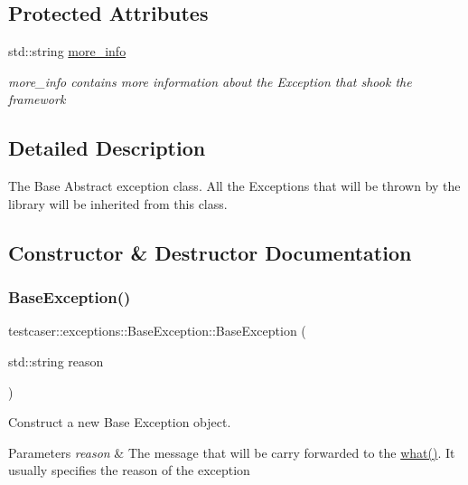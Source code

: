 \subsection*{Protected Attributes}
\begin{DoxyCompactItemize}
\item 
std\+::string \mbox{\hyperlink{classtestcaser_1_1exceptions_1_1BaseException_abfc26d4451ae832886c32ad2e283104e}{more\+\_\+info}}
\begin{DoxyCompactList}\small\item\em more\+\_\+info contains more information about the Exception that shook the framework \end{DoxyCompactList}\end{DoxyCompactItemize}


\subsection{Detailed Description}
The Base Abstract exception class. All the Exceptions that will be thrown by the library will be inherited from this class. 



\subsection{Constructor \& Destructor Documentation}
\mbox{\label{classtestcaser_1_1exceptions_1_1BaseException_a70b5f42e6197e2600f7163f843060af2}} 
\subsubsection{\texorpdfstring{BaseException()}{BaseException()}}
{\footnotesize\ttfamily testcaser\+::exceptions\+::\+Base\+Exception\+::\+Base\+Exception (\begin{DoxyParamCaption}\item[{std\+::string}]{reason }\end{DoxyParamCaption})\hspace{0.3cm}{\ttfamily [inline]}}



Construct a new Base Exception object. 


\begin{DoxyParams}{Parameters}
{\em reason} & The message that will be carry forwarded to the \mbox{\hyperlink{classtestcaser_1_1exceptions_1_1BaseException_a28590a861913f870d9761990853e74b7}{what()}}. It usually specifies the reason of the exception \\
\hline
\end{DoxyParams}


